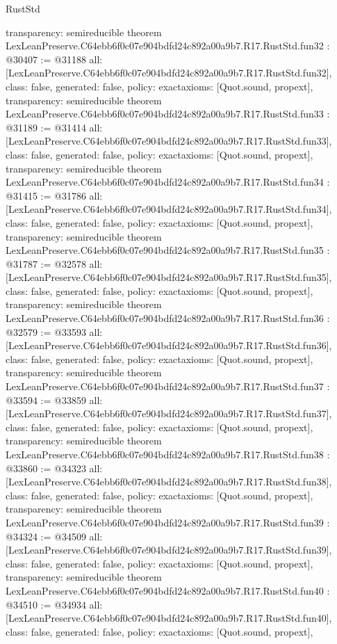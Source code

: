 \begin{lexlean}{RustStd}
\begin{coremodule}
{  transparency: semireducible
}
theorem LexLeanPreserve.C64ebb6f0c07e904bdfd24c892a00a9b7.R17.RustStd.fun32 : @30407 := @31188 {
  all: [LexLeanPreserve.C64ebb6f0c07e904bdfd24c892a00a9b7.R17.RustStd.fun32],
  class: false,
  generated: false,
  policy: exact{axioms: [Quot.sound, propext]},
  transparency: semireducible
}
theorem LexLeanPreserve.C64ebb6f0c07e904bdfd24c892a00a9b7.R17.RustStd.fun33 : @31189 := @31414 {
  all: [LexLeanPreserve.C64ebb6f0c07e904bdfd24c892a00a9b7.R17.RustStd.fun33],
  class: false,
  generated: false,
  policy: exact{axioms: [Quot.sound, propext]},
  transparency: semireducible
}
theorem LexLeanPreserve.C64ebb6f0c07e904bdfd24c892a00a9b7.R17.RustStd.fun34 : @31415 := @31786 {
  all: [LexLeanPreserve.C64ebb6f0c07e904bdfd24c892a00a9b7.R17.RustStd.fun34],
  class: false,
  generated: false,
  policy: exact{axioms: [Quot.sound, propext]},
  transparency: semireducible
}
theorem LexLeanPreserve.C64ebb6f0c07e904bdfd24c892a00a9b7.R17.RustStd.fun35 : @31787 := @32578 {
  all: [LexLeanPreserve.C64ebb6f0c07e904bdfd24c892a00a9b7.R17.RustStd.fun35],
  class: false,
  generated: false,
  policy: exact{axioms: [Quot.sound, propext]},
  transparency: semireducible
}
theorem LexLeanPreserve.C64ebb6f0c07e904bdfd24c892a00a9b7.R17.RustStd.fun36 : @32579 := @33593 {
  all: [LexLeanPreserve.C64ebb6f0c07e904bdfd24c892a00a9b7.R17.RustStd.fun36],
  class: false,
  generated: false,
  policy: exact{axioms: [Quot.sound, propext]},
  transparency: semireducible
}
theorem LexLeanPreserve.C64ebb6f0c07e904bdfd24c892a00a9b7.R17.RustStd.fun37 : @33594 := @33859 {
  all: [LexLeanPreserve.C64ebb6f0c07e904bdfd24c892a00a9b7.R17.RustStd.fun37],
  class: false,
  generated: false,
  policy: exact{axioms: [Quot.sound, propext]},
  transparency: semireducible
}
theorem LexLeanPreserve.C64ebb6f0c07e904bdfd24c892a00a9b7.R17.RustStd.fun38 : @33860 := @34323 {
  all: [LexLeanPreserve.C64ebb6f0c07e904bdfd24c892a00a9b7.R17.RustStd.fun38],
  class: false,
  generated: false,
  policy: exact{axioms: [Quot.sound, propext]},
  transparency: semireducible
}
theorem LexLeanPreserve.C64ebb6f0c07e904bdfd24c892a00a9b7.R17.RustStd.fun39 : @34324 := @34509 {
  all: [LexLeanPreserve.C64ebb6f0c07e904bdfd24c892a00a9b7.R17.RustStd.fun39],
  class: false,
  generated: false,
  policy: exact{axioms: [Quot.sound, propext]},
  transparency: semireducible
}
theorem LexLeanPreserve.C64ebb6f0c07e904bdfd24c892a00a9b7.R17.RustStd.fun40 : @34510 := @34934 {
  all: [LexLeanPreserve.C64ebb6f0c07e904bdfd24c892a00a9b7.R17.RustStd.fun40],
  class: false,
  generated: false,
  policy: exact{axioms: [Quot.sound, propext]},
}
\end{coremodule}
\end{lexlean}
